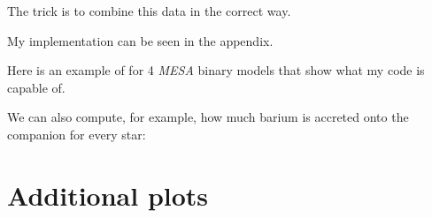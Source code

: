 \documentclass[a4paper,10pt]{article}
\begin{document}
The trick is to combine this data in the correct way.

My implementation can be seen in the appendix.

Here is an example of for 4 \emph{MESA} binary models that show what my code is capable of.

\begin{figure}[ht]
    \centering
\end{figure}

We can also compute, for example, how much barium is accreted onto the companion for every star:

\begin{figure}[ht]
    \centering
\end{figure}

\begin{figure}[ht]
    \centering
\end{figure}




\appendix
\section{Additional plots}\label{plots}

\begin{figure}[ht]
    \centering
\end{figure}

\begin{figure}[ht]
    \centering
\end{figure}

\begin{figure}[ht]
    \centering
\end{figure}


\begin{figure}[ht]
    \centering
\end{figure}
\end{document}
